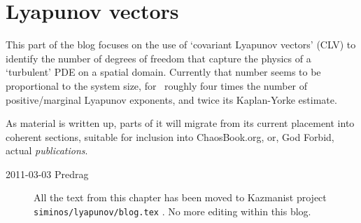 
\chapter{Lyapunov vectors}
\label{s:LyapunovVec}

This part of the blog focuses on the use of `covariant Lyapunov
vectors' (CLV) to identify the number of degrees of freedom
that capture the physics of a `turbulent' PDE on a spatial
domain. Currently that number seems to be proportional to the
system size, for \KSe\ roughly four times the number of
 positive/marginal Lyapunov exponents, and twice its
Kaplan-Yorke estimate.

As material is written up, parts of it will migrate from its
current placement into coherent sections, suitable for
inclusion into ChaosBook.org, or, God Forbid, actual {\em
publications}.

\begin{description}

\item[2011-03-03 Predrag]
All the text from this chapter has been moved to
Kazmanist project \texttt{siminos/lyapunov/blog.tex} .
No more editing within this blog.

\end{description}


\renewcommand{\ssp}{a}
